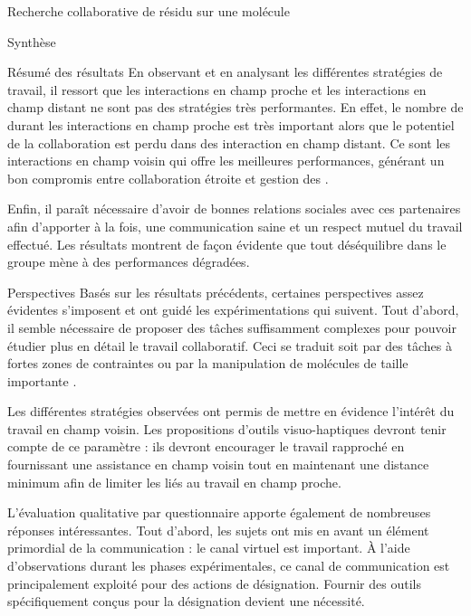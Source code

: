 \documentclass[myfrancais]{mythesis}
\begin{document}
\begin{mychapter}{Recherche collaborative de résidu sur une molécule}
\begin{mysection}{Synthèse}
\begin{mysubsection}{Résumé des résultats}
				En observant et en analysant les différentes stratégies de travail, il ressort que les interactions en champ proche et les interactions en champ distant ne sont pas des stratégies très performantes.
				En effet, le nombre de  durant les interactions en champ proche est très important alors que le potentiel de la collaboration est perdu dans des interaction en champ distant.
				Ce sont les interactions en champ voisin qui offre les meilleures performances, générant un bon compromis entre collaboration étroite et gestion des .

				Enfin, il paraît nécessaire d'avoir de bonnes relations sociales avec ces partenaires afin d'apporter à la fois, une communication saine et un respect mutuel du travail effectué.
				Les résultats montrent de façon évidente que tout déséquilibre dans le groupe mène à des performances dégradées.
			\end{mysubsection}
			\begin{mysubsection}{Perspectives}
				Basés sur les résultats précédents, certaines perspectives assez évidentes s'imposent et ont guidé les expérimentations qui suivent.
				Tout d'abord, il semble nécessaire de proposer des tâches suffisamment complexes pour pouvoir étudier plus en détail le travail collaboratif.
				Ceci se traduit soit par des tâches à fortes zones de contraintes  ou par la manipulation de molécules de taille importante .

				Les différentes stratégies observées ont permis de mettre en évidence l'intérêt du travail en champ voisin.
				Les propositions d'outils visuo-haptiques devront tenir compte de ce paramètre : ils devront encourager le travail rapproché en fournissant une assistance en champ voisin tout en maintenant une distance minimum afin de limiter les  liés au travail en champ proche.

				L'évaluation qualitative par questionnaire apporte également de nombreuses réponses intéressantes.
				Tout d'abord, les sujets ont mis en avant un élément primordial de la communication : le canal virtuel est important.
				À l'aide d'observations durant les phases expérimentales, ce canal de communication est principalement exploité pour des actions de désignation.
				Fournir des outils spécifiquement conçus pour la désignation devient une nécessité.


\end{mysubsection}
\end{mysection}
\end{mychapter}
\end{document}
